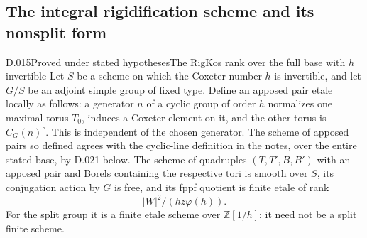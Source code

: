 \subsection{The integral rigidification scheme and its nonsplit form}
\begin{saresult}{D.015}{Proved under stated hypotheses}{The RigKos rank over the full base with $h$ invertible}
Let $S$ be a scheme on which the Coxeter number $h$ is invertible,
and let $G/S$ be an adjoint simple group of fixed type.  Define an
apposed pair etale locally as follows: a generator $n$ of a cyclic
group of order $h$ normalizes one maximal torus $T_0$, induces a
Coxeter element on it, and the other torus is $C_G(n)^\circ$.
This is independent of the chosen generator.  The scheme of
apposed pairs so defined agrees with the cyclic-line definition
in the notes, over the entire stated base, by D.021 below.
The scheme of
quadruples $(T,T',B,B')$ with an apposed pair and Borels containing
the respective tori is smooth over $S$, its conjugation action by
$G$ is free, and its fppf quotient is finite etale of rank
\[
 |W|^2/(h z\varphi(h)).
\]
For the split group it is a finite etale scheme over
$\mathbb Z[1/h]$; it need not be a split finite scheme.
\end{saresult}
